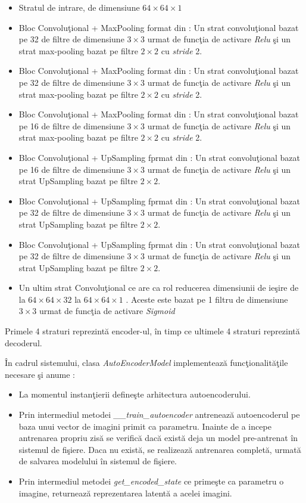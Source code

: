 \documentclass[a4paper,12pt]{report}
\begin{document}
\begin{itemize}
\item Stratul de intrare, de dimensiune \( 64 \times 64 \times 1\)
\item Bloc  Convoluţional + MaxPooling format din : Un strat convoluţional bazat pe 32 de filtre de dimensiune \(3 \times 3\) urmat de funcţia de activare \emph{Relu} şi un strat max-pooling bazat pe filtre \(2 \times 2\) cu \emph{stride} 2.
\item Bloc  Convoluţional + MaxPooling format din : Un strat convoluţional bazat pe 32 de filtre de dimensiune \(3 \times 3\) urmat de funcţia de activare \emph{Relu} şi un strat max-pooling bazat pe filtre \(2 \times 2\) cu \emph{stride} 2.
\item Bloc  Convoluţional + MaxPooling format din : Un strat convoluţional bazat pe 16 de filtre de dimensiune \(3 \times 3\) urmat de funcţia de activare \emph{Relu} şi un strat max-pooling bazat pe filtre \(2 \times 2\) cu \emph{stride} 2.
\item Bloc Convoluţional + UpSampling fprmat din : Un strat convoluţional bazat pe 16 de filtre de dimensiune \(3 \times 3\) urmat de funcţia de activare \emph{Relu} şi un strat UpSampling bazat pe filtre \(2 \times 2\).
\item Bloc Convoluţional + UpSampling fprmat din : Un strat convoluţional bazat pe 32 de filtre de dimensiune \(3 \times 3\) urmat de funcţia de activare \emph{Relu} şi un strat UpSampling bazat pe filtre \(2 \times 2\).
\item Bloc Convoluţional + UpSampling fprmat din : Un strat convoluţional bazat pe 32 de filtre de dimensiune \(3 \times 3\) urmat de funcţia de activare \emph{Relu} şi un strat UpSampling bazat pe filtre \(2 \times 2\).
\item Un ultim strat Convoluţional ce are ca rol reducerea dimensiunii de ieşire de la \(64 \times 64 \times 32\) la \(64 \times 64 \times 1\)\cite{ionescu2019object} .  Aceste este bazat pe 1 filtru de dimensiune \(3 \times 3 \) urmat de funcţia de activare \emph{Sigmoid}
\end{itemize}
Primele 4 straturi reprezintă encoder-ul, în timp ce ultimele 4 straturi reprezintă decoderul. 
\par În cadrul sistemului, clasa \emph{AutoEncoderModel} implementează funcţionalităţile necesare şi anume : 
\begin{itemize}
\item La momentul instanţierii defineşte arhitectura autoencoderului. 
\item Prin intermediul metodei \emph{\_\_train\_autoencoder} antrenează autoencoderul pe baza unui vector de imagini primit ca parametru. Inainte de a incepe antrenarea propriu zisă se verifică dacă există deja un model pre-antrenat în sistemul de fişiere. Daca nu există, se realizează antrenarea completă, urmată de salvarea modelului în sistemul de fişiere.
\item Prin intermediul metodei \emph{get\_encoded\_state} ce primeşte ca parametru o imagine, returnează reprezentarea latentă a acelei imagini. 
\end{itemize}
\end{document}
